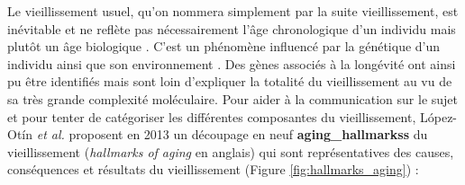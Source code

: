Le vieillissement usuel, qu'on nommera simplement par la suite vieillissement, est inévitable et ne reflète pas nécessairement l'âge chronologique d'un individu mais plutôt un âge biologique \cite{Horvath2013Oct}. C'est un phénomène influencé par la génétique d'un individu \cite{Khan2017Aug, deMagalhaes2003Mar} ainsi que son environnement \cite{Jones2015Dec}. Des gènes associés à la longévité ont ainsi pu être identifiés mais sont loin d'expliquer la totalité du vieillissement au vu de sa très grande complexité moléculaire. Pour aider à la communication sur le sujet et pour tenter de catégoriser les différentes composantes du vieillissement, López-Otín \textit{et al.} proposent en 2013 un découpage en neuf \textbf{\glspl{aging_hallmarks}} du vieillissement (\textit{hallmarks of aging} en anglais) qui sont représentatives des causes, conséquences et résultats du vieillissement (Figure \ref{fig:hallmarks_aging}) \cite{Lopez-Otin2013} : 
